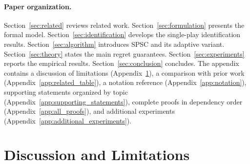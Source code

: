 \documentclass{article}
\begin{document}
\paragraph{Paper organization.}
Section~\ref{sec:related} reviews related work.
Section~\ref{sec:formulation} presents the formal model.
Section~\ref{sec:identification} develops the single-play identification results.
Section~\ref{sec:algorithm} introduces SPSC and its adaptive variant.
Section~\ref{sec:theory} states the main regret guarantees.
Section~\ref{sec:experiments} reports the empirical results.
Section~\ref{sec:conclusion} concludes.
The appendix contains a discussion of limitations (Appendix~\ref{sec:discussion}), a comparison with prior work (Appendix~\ref{app:related_table}), a notation reference (Appendix~\ref{app:notation}), supporting statements organized by topic (Appendix~\ref{app:supporting_statements}), complete proofs in dependency order (Appendix~\ref{app:all_proofs}), and additional experiments (Appendix~\ref{app:additional_experiments}).

\section{Discussion and Limitations}
\label{sec:discussion}

  
\end{document}
